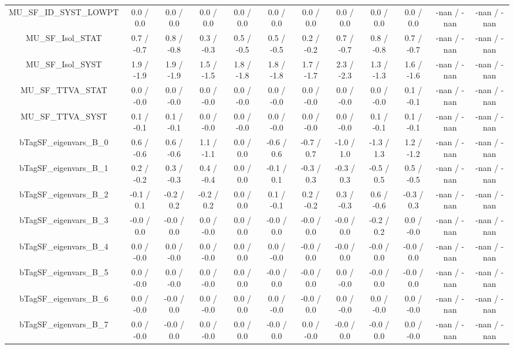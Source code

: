 \begin{table}[htbp]
\begin{center}
\begin{tabular}{|c|c|c|c|c|c|c|c|c|c|c|c|}
  MU_SF_ID_SYST_LOWPT & 0.0 / 0.0 & 0.0 / 0.0 & 0.0 / 0.0 & 0.0 / 0.0 & 0.0 / 0.0 & 0.0 / 0.0 & 0.0 / 0.0 & 0.0 / 0.0 & 0.0 / 0.0 & -nan / -nan & -nan / -nan \\ 
  MU_SF_Isol_STAT & 0.7 / -0.7 & 0.8 / -0.8 & 0.3 / -0.3 & 0.5 / -0.5 & 0.5 / -0.5 & 0.2 / -0.2 & 0.7 / -0.7 & 0.8 / -0.8 & 0.7 / -0.7 & -nan / -nan & -nan / -nan \\ 
  MU_SF_Isol_SYST & 1.9 / -1.9 & 1.9 / -1.9 & 1.5 / -1.5 & 1.8 / -1.8 & 1.8 / -1.8 & 1.7 / -1.7 & 2.3 / -2.3 & 1.3 / -1.3 & 1.6 / -1.6 & -nan / -nan & -nan / -nan \\ 
  MU_SF_TTVA_STAT & 0.0 / -0.0 & 0.0 / -0.0 & 0.0 / -0.0 & 0.0 / -0.0 & 0.0 / -0.0 & 0.0 / -0.0 & 0.0 / -0.0 & 0.0 / -0.0 & 0.1 / -0.1 & -nan / -nan & -nan / -nan \\ 
  MU_SF_TTVA_SYST & 0.1 / -0.1 & 0.1 / -0.1 & 0.0 / -0.0 & 0.0 / -0.0 & 0.0 / -0.0 & 0.0 / -0.0 & 0.0 / -0.0 & 0.1 / -0.1 & 0.1 / -0.1 & -nan / -nan & -nan / -nan \\ 
  bTagSF_eigenvars_B_0 & 0.6 / -0.6 & 0.6 / -0.6 & 1.1 / -1.1 & 0.0 / 0.0 & -0.6 / 0.6 & -0.7 / 0.7 & -1.0 / 1.0 & -1.3 / 1.3 & 1.2 / -1.2 & -nan / -nan & -nan / -nan \\ 
  bTagSF_eigenvars_B_1 & 0.2 / -0.2 & 0.3 / -0.3 & 0.4 / -0.4 & 0.0 / 0.0 & -0.1 / 0.1 & -0.3 / 0.3 & -0.3 / 0.3 & -0.5 / 0.5 & 0.5 / -0.5 & -nan / -nan & -nan / -nan \\ 
  bTagSF_eigenvars_B_2 & -0.1 / 0.1 & -0.2 / 0.2 & -0.2 / 0.2 & 0.0 / 0.0 & 0.1 / -0.1 & 0.2 / -0.2 & 0.3 / -0.3 & 0.6 / -0.6 & -0.3 / 0.3 & -nan / -nan & -nan / -nan \\ 
  bTagSF_eigenvars_B_3 & -0.0 / 0.0 & -0.0 / 0.0 & 0.0 / -0.0 & 0.0 / 0.0 & -0.0 / 0.0 & -0.0 / 0.0 & -0.0 / 0.0 & -0.2 / 0.2 & 0.0 / -0.0 & -nan / -nan & -nan / -nan \\ 
  bTagSF_eigenvars_B_4 & 0.0 / -0.0 & 0.0 / -0.0 & 0.0 / -0.0 & 0.0 / 0.0 & 0.0 / -0.0 & -0.0 / 0.0 & -0.0 / 0.0 & -0.0 / 0.0 & -0.0 / 0.0 & -nan / -nan & -nan / -nan \\ 
  bTagSF_eigenvars_B_5 & 0.0 / -0.0 & 0.0 / -0.0 & 0.0 / -0.0 & 0.0 / 0.0 & -0.0 / 0.0 & -0.0 / 0.0 & 0.0 / -0.0 & -0.0 / 0.0 & -0.0 / 0.0 & -nan / -nan & -nan / -nan \\ 
  bTagSF_eigenvars_B_6 & 0.0 / -0.0 & -0.0 / 0.0 & 0.0 / -0.0 & 0.0 / 0.0 & 0.0 / -0.0 & -0.0 / 0.0 & 0.0 / -0.0 & 0.0 / -0.0 & 0.0 / -0.0 & -nan / -nan & -nan / -nan \\ 
  bTagSF_eigenvars_B_7 & 0.0 / -0.0 & -0.0 / 0.0 & 0.0 / -0.0 & 0.0 / 0.0 & -0.0 / 0.0 & 0.0 / -0.0 & -0.0 / 0.0 & -0.0 / 0.0 & 0.0 / -0.0 & -nan / -nan & -nan / -nan \\ 

\end{tabular}
\end{center}
\end{table}

